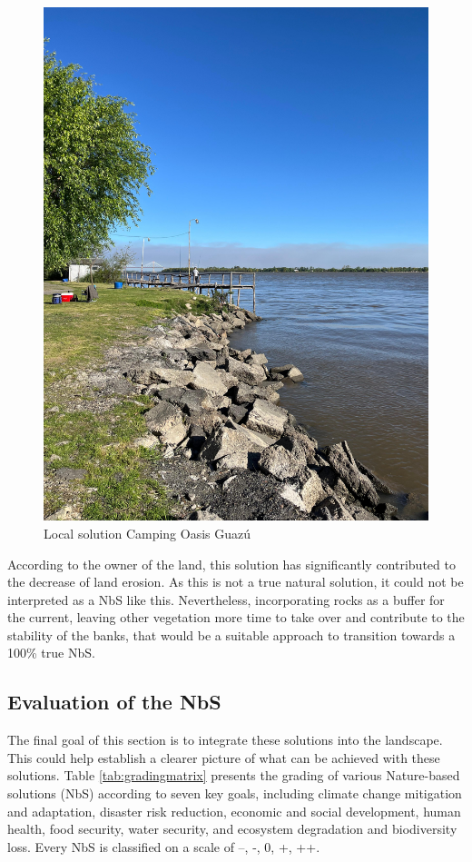 \begin{figure}[H]
    \centering
    \includegraphics[width=0.5\linewidth]{figures/appendixE/rocks.jpg}
    \caption{Local solution Camping Oasis Guazú}
    \label{fig:local solution Camping Oasis Guazu}
\end{figure}

According to the owner of the land, this solution has significantly contributed to the decrease of land erosion. As this is not a true natural solution, it could not be interpreted as a NbS like this. Nevertheless, incorporating rocks as a buffer for the current, leaving other vegetation more time to take over and contribute to the stability of the banks, that would be a suitable approach to transition towards a 100\% true NbS.






\subsection{Evaluation of the NbS}

The final goal of this section is to integrate these solutions into the landscape. This could help establish a clearer picture of what can be achieved with these solutions. Table \ref{tab:gradingmatrix} presents the grading of various Nature-based solutions (NbS) according to seven key goals, including climate change mitigation and adaptation, disaster risk reduction, economic and social development, human health, food security, water security, and ecosystem degradation and biodiversity loss. Every NbS is classified on a scale of --, -, 0, +, ++. 

